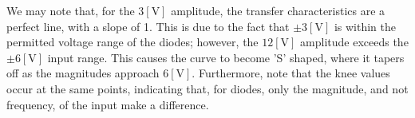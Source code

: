 \begin{enumerate}
    We may note that, for the $3[\si{\volt}]$ amplitude, the transfer characteristics are a perfect line, with a slope of 1. This is due to the fact that $\pm3[\si{\volt}]$ is within the permitted voltage range of the diodes; however, the $12[\si{\volt}]$ amplitude exceeds the $\pm6[\si{\volt}]$ input range. This causes the curve to become 'S' shaped, where it tapers off as the magnitudes approach $6[\si{\volt}]$. Furthermore, note that the knee values occur at the same points, indicating that, for diodes, only the magnitude, and not frequency, of the input make a difference.

\end{enumerate}



